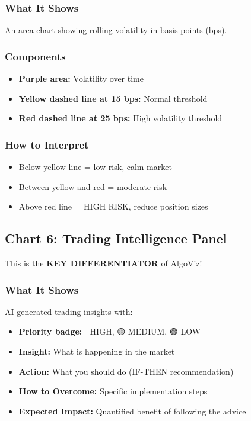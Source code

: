 \documentclass[12pt,a4paper]{article}
\begin{document}
\subsubsection{What It Shows}
An area chart showing rolling volatility in basis points (bps).

\subsubsection{Components}
\begin{itemize}
    \item \textbf{Purple area:} Volatility over time
    \item \textbf{Yellow dashed line at 15 bps:} Normal threshold
    \item \textbf{Red dashed line at 25 bps:} High volatility threshold
\end{itemize}

\subsubsection{How to Interpret}
\begin{itemize}
    \item Below yellow line = low risk, calm market
    \item Between yellow and red = moderate risk
    \item Above red line = HIGH RISK, reduce position sizes
\end{itemize}

\subsection{Chart 6: Trading Intelligence Panel}

This is the \textbf{KEY DIFFERENTIATOR} of AlgoViz!

\subsubsection{What It Shows}
AI-generated trading insights with:
\begin{itemize}
    \item \textbf{Priority badge:} 🔴 HIGH, 🟡 MEDIUM, 🟢 LOW
    \item \textbf{Insight:} What is happening in the market
    \item \textbf{Action:} What you should do (IF-THEN recommendation)
    \item \textbf{How to Overcome:} Specific implementation steps
    \item \textbf{Expected Impact:} Quantified benefit of following the advice
\end{itemize}
\end{document}
